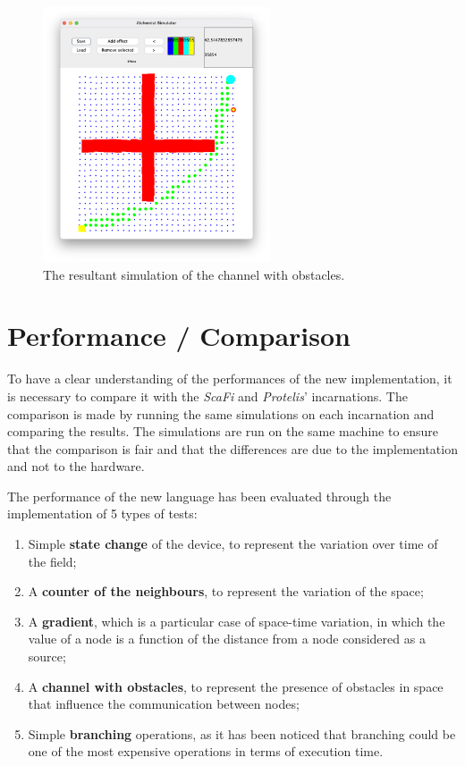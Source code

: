 \begin{figure}[ht!]
    \centering
    \includegraphics[width=0.6\textwidth]{figures/channel}
    \caption{The resultant simulation of the channel with obstacles.}
    \label{fig:channel}
\end{figure}

\section{Performance / Comparison}
\label{sec:performance-/-comparison}
To have a clear understanding of the performances of the new implementation, it is necessary to compare it with the
\emph{ScaFi} and \emph{Protelis}' incarnations.
The comparison is made by running the same simulations on each incarnation and comparing the results.
The simulations are run on the same machine to ensure that the comparison is fair and that the differences are due to the
implementation and not to the hardware.

The performance of the new language has been evaluated through the implementation of 5 types of tests:
\begin{enumerate}
    \item Simple \textbf{state change} of the device, to represent the variation over time of the field;
    \item A \textbf{counter of the neighbours}, to represent the variation of the space;
    \item A \textbf{gradient}, which is a particular case of space-time variation, in which the value of a node is a
        function of the distance from a node considered as a source;
    \item A \textbf{channel with obstacles}, to represent the presence of obstacles in space that influence the communication between nodes;
    \item Simple \textbf{branching} operations, as it has been noticed that branching could be one of the most expensive operations in terms of execution time.
\end{enumerate}


